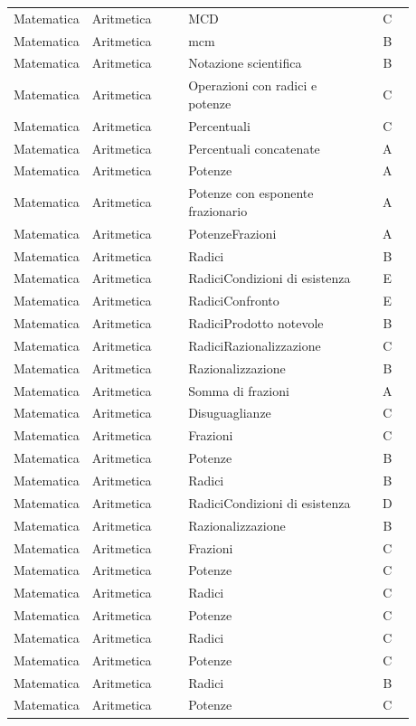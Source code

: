 \documentclass[20pt, a4paper]{article}
\begin{document}
\begin{longtable}{@{}>{\raggedright\arraybackslash}p{0.18\linewidth}>{\raggedright\arraybackslash}p{0.24\linewidth}>{\raggedright\arraybackslash}p{0.46\linewidth}c@{}}
Matematica & Aritmetica & MCD & C \\
Matematica & Aritmetica & mcm & B \\
Matematica & Aritmetica & Notazione scientifica & B \\
Matematica & Aritmetica & Operazioni con radici e potenze & C \\
Matematica & Aritmetica & Percentuali & C \\
Matematica & Aritmetica & Percentuali concatenate & A \\
Matematica & Aritmetica & Potenze & A \\
Matematica & Aritmetica & Potenze con esponente frazionario & A \\
Matematica & Aritmetica & PotenzeFrazioni & A \\
Matematica & Aritmetica & Radici & B \\
Matematica & Aritmetica & RadiciCondizioni di esistenza & E \\
Matematica & Aritmetica & RadiciConfronto & E \\
Matematica & Aritmetica & RadiciProdotto notevole & B \\
Matematica & Aritmetica & RadiciRazionalizzazione & C \\
Matematica & Aritmetica & Razionalizzazione & B \\
Matematica & Aritmetica & Somma di frazioni & A \\
Matematica & Aritmetica & Disuguaglianze & C \\
Matematica & Aritmetica & Frazioni & C \\
Matematica & Aritmetica & Potenze & B \\
Matematica & Aritmetica & Radici & B \\
Matematica & Aritmetica & RadiciCondizioni di esistenza & D \\
Matematica & Aritmetica & Razionalizzazione & B \\
Matematica & Aritmetica & Frazioni & C \\
Matematica & Aritmetica & Potenze & C \\
Matematica & Aritmetica & Radici & C \\
Matematica & Aritmetica & Potenze & C \\
Matematica & Aritmetica & Radici & C \\
Matematica & Aritmetica & Potenze & C \\
Matematica & Aritmetica & Radici & B \\
Matematica & Aritmetica & Potenze & C \\

\end{longtable}
\end{document}
